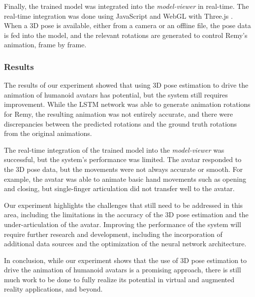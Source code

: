 Finally, the trained model was integrated into the \emph{model-viewer} in real-time.
The real-time integration was done using JavaScript and WebGL with Three.js .
When a 3D pose is available, either from a camera or an offline file, the pose data is fed into the model,
and the relevant rotations are generated to control Remy's animation, frame by frame.

\subsubsection{Results}

The results of our experiment showed that using 3D pose estimation to drive the animation of
humanoid avatars has potential, but the system still requires improvement.
While the LSTM network was able to generate animation rotations for Remy, the resulting animation was not entirely accurate,
and there were discrepancies between the predicted rotations and the ground truth rotations from the original animations.

The real-time integration of the trained model into the \emph{model-viewer} was successful,
but the system's performance was limited.
The avatar responded to the 3D pose data, but the movements were not always accurate or smooth.
For example, the avatar was able to animate basic hand movements such as opening and closing,
but single-finger articulation did not transfer well to the avatar.

Our experiment highlights the challenges that still need to be addressed in this area,
including the limitations in the accuracy of the 3D pose estimation and the under-articulation of the avatar.
Improving the performance of the system will require further research and development,
including the incorporation of additional data sources and the optimization of the neural network architecture.

In conclusion, while our experiment shows that the use of 3D pose estimation to drive the animation of
humanoid avatars is a promising approach, there is still much work to be done to
fully realize its potential in virtual and augmented reality applications, and beyond.
